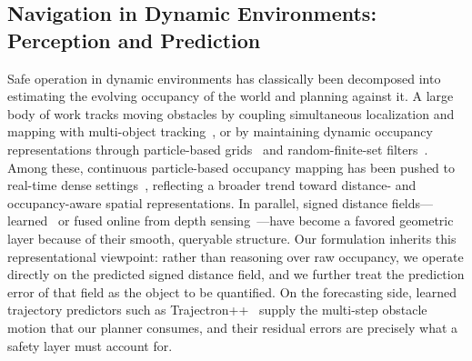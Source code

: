 \documentclass[lettersize,journal]{IEEEtran}
\begin{document}
\subsection{Navigation in Dynamic Environments: Perception and Prediction}
Safe operation in dynamic environments has classically been decomposed into estimating the evolving occupancy of the world and planning against it. A large body of work tracks moving obstacles by coupling simultaneous localization and mapping with multi-object tracking~\cite{wang2007simultaneous,coue2006bayesian}, or by maintaining dynamic occupancy representations through particle-based grids~\cite{danescu2011modeling,tanzmeister2014grid} and random-finite-set filters~\cite{nuss2018random,chen2023continuous}. Among these, continuous particle-based occupancy mapping has been pushed to real-time dense settings~\cite{chen2023continuous}, reflecting a broader trend toward distance- and occupancy-aware spatial representations. In parallel, signed distance fields---learned~\cite{park2019deepsdf,ortiz2022isdf} or fused online from depth sensing~\cite{newcombe2011kinectfusion}---have become a favored geometric layer because of their smooth, queryable structure. Our formulation inherits this representational viewpoint: rather than reasoning over raw occupancy, we operate directly on the predicted signed distance field, and we further treat the prediction error of that field as the object to be quantified. On the forecasting side, learned trajectory predictors such as Trajectron++~\cite{salzmann2020trajectron} supply the multi-step obstacle motion that our planner consumes, and their residual errors are precisely what a safety layer must account for.
\end{document}
